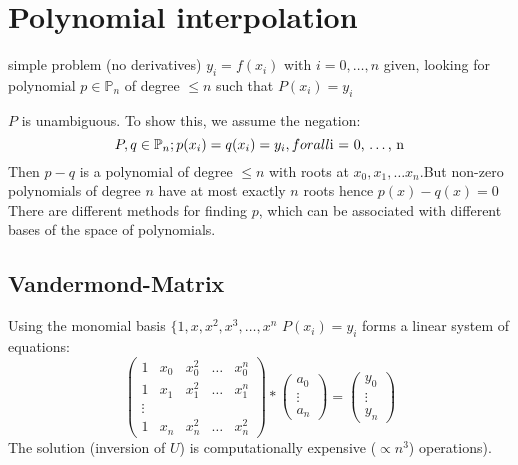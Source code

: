 \section{Polynomial interpolation}\label{sec:polynomial-interpolation}
simple problem (no derivatives) $y_i = f(x_i)$ with $i = 0, \ldots, n$ given,
looking for polynomial $p \in \mathbb{P}_n$ of degree $\leq n$ such that
$P(x_i) = y_i$

$P$ is unambiguous.
To show this, we assume the negation:
\begin{equation*}
    P, q \in \mathbb{P}_n; p(x_i)=q(x_i)=y_i, for all $i = 0, \ldots, n$
\end{equation*}
Then $p-q$ is a polynomial of degree $\leq n$ with roots at
$x_0, x_1, \ldots x_n$.But non-zero polynomials of degree $n$ have at most
exactly $n$ roots hence $p(x)-q(x) = 0$
There are different methods for finding $p$, which can be associated with different
bases of the space of polynomials.
\subsection{Vandermond-Matrix}\label{subsec:vandermond-matrix}
Using the monomial basis $\{ 1, x, x^2, x^3, \ldots, x^n$ $P(x_i) = y_i$ forms a
linear system of equations:
\begin{equation*}
    \begin{pmatrix*}
        1 &x_0 &x_0^2 &\ldots & x_0^n\\
        1 &x_1 &x_1^2 &\ldots & x_1^n\\
        \vdots \\
        1 & x_n & x_n^2&\ldots  &x_n^2
    \end{pmatrix*}
    *
    \begin{pmatrix*}
        a_0 \\
        \vdots\\
        a_n
    \end{pmatrix*}
    =
    \begin{pmatrix*}
        y_0\\
        \vdots\\
        y_n
    \end{pmatrix*}
\end{equation*}
The solution (inversion of $U$) is computationally expensive ($\propto n^3$) operations).
